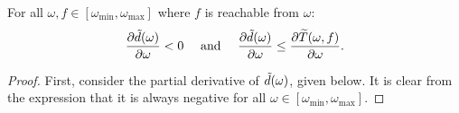 \begin{property} \label{prop:deadline-derivative}
For all $\omega, f \in [\omega_{\min}, \omega_{\max}]$ where $f$ is reachable from $\omega$:
\begin{equation}\label{eqn:deadline-derivative}
\frac{\partial \Tilde{d}(\omega)}{\partial \omega}< 0~~~~ \textrm{and} ~~~~\frac{\partial \Tilde{d}(\omega)}{\partial \omega} \leq \frac{\partial \widetilde{T}(\omega,f)}{\partial \omega}.
\end{equation}
\end{property}
\begin{proof}
First, consider the partial derivative of $\Tilde{d}(\omega)$, given below.
 It is clear from the expression that it is always negative for all $\omega \in [\omega_{\min}, \omega_{\max}]$.


\end{proof}
